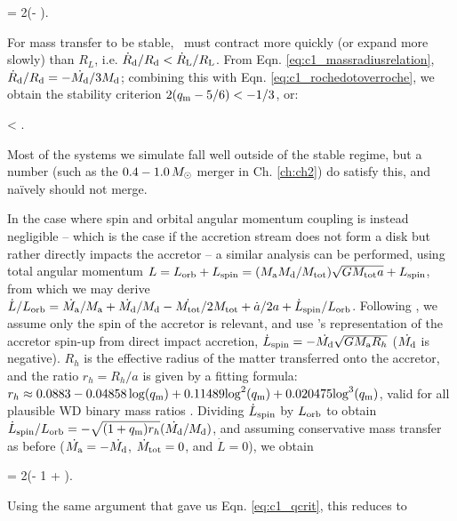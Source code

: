 \eqbegin
{} = 2(\qm- )\frac{\dot{\Md}}{\Md}.
\label{eq:c1_rochedotoverroche}
\eqend

\noindent For mass transfer to be stable, \Rd\ must contract more quickly (or expand more slowly) than $R_L$, i.e. $\dot{R}_\mrm{d}/\Rd < \dot{R}_\mrm{L}/R_\mrm{L}$.  From Eqn. \ref{eq:c1_massradiusrelation}, $\dot{R}_\mrm{d}/\Rd = -\dot{\Md}/3\Md$; combining this with Eqn. \ref{eq:c1_rochedotoverroche}, we obtain the stability criterion $2(\qm- 5/6) < -1/3$, or:


\eqbegin
\qm < .
\label{eq:c1_qcrit}
\eqend

\noindent Most of the systems we simulate fall well outside of the stable regime, but a number (such as the $0.4 - 1.0\,\Msun$ merger in Ch. \ref{ch:ch2}) do satisfy this, and na\"{i}vely should not merge.

In the case where spin and orbital angular momentum coupling is instead negligible -- which is the case if the accretion stream does not form a disk but rather directly impacts the accretor \citep{nele+01} -- a similar analysis can be performed, using total angular momentum $L = L_\mrm{orb} + L_\mrm{spin} = (\Ma\Md/\Mtot)\sqrt{G\Mtot a} + L_\mrm{spin}$, from which we may derive $\dot{L}/L_\mrm{orb} = \dot{\Ma}/\Ma + \dot{\Md}/\Md - \dot{\Mtot}/2\Mtot + \dot{a}/2a + \dot{L}_\mrm{spin}/L_\mrm{orb}$.  Following \cite{marsns04}, we assume only the spin of the accretor is relevant, and use \cite{verbr88}'s representation of the accretor spin-up from direct impact accretion, $\dot{L}_\mrm{spin} = -\dot{\Md}\sqrt{G\Ma R_h}$ ($\dot{\Md}$ is negative).  $R_h$ is the effective radius of the matter transferred onto the accretor, and the ratio $r_h = R_h/a$ is given by a fitting formula: $r_h \approx 0.0883 - 0.04858\log(\qm) + 0.11489{\log}^2(\qm) + 0.020475{\log}^3(\qm)$, valid for all plausible WD binary mass ratios \citep{verbr88}.  Dividing $\dot{L}_\mathrm{spin}$ by $L_\mathrm{orb}$ to obtain $\dot{L}_\mrm{spin}/L_\mrm{orb} = -\sqrt{(1 + \qm)r_h}(\dot{\Md}/\Md)$, and assuming conservative mass transfer as before ($\dot{\Ma} = -\dot{\Md}$, $\dot{M}_\mathrm{tot} = 0$, and $\dot{L} = 0$), we obtain

\eqbegin
{} = 2\left(\qm- 1 + \right)\frac{\dot{\Md}}{\Md}.
\label{eq:c1_adotovera2}
\eqend

\noindent Using the same argument that gave us Eqn. \ref{eq:c1_qcrit}, this reduces to


